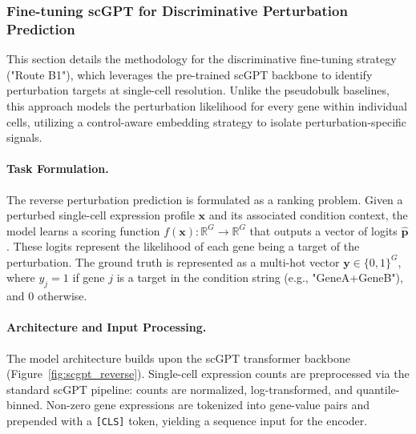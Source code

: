 \documentclass[conference]{IEEEtran}
\begin{document}
\subsubsection{Fine-tuning scGPT for Discriminative Perturbation Prediction}

This section details the methodology for the discriminative fine-tuning strategy ("Route B1"), which leverages the pre-trained scGPT backbone to identify perturbation targets at single-cell resolution. Unlike the pseudobulk baselines, this approach models the perturbation likelihood for every gene within individual cells, utilizing a control-aware embedding strategy to isolate perturbation-specific signals.

\paragraph{Task Formulation.}
The reverse perturbation prediction is formulated as a ranking problem. Given a perturbed single-cell expression profile $\mathbf{x}$ and its associated condition context, the model learns a scoring function $f(\mathbf{x}): \mathbb{R}^G \rightarrow \mathbb{R}^G$ that outputs a vector of logits $\hat{\mathbf{p}}$. These logits represent the likelihood of each gene being a target of the perturbation.
The ground truth is represented as a multi-hot vector $\mathbf{y} \in \{0,1\}^G$, where $y_j = 1$ if gene $j$ is a target in the condition string (e.g., "GeneA+GeneB"), and 0 otherwise.

\paragraph{Architecture and Input Processing.}
The model architecture builds upon the scGPT transformer backbone (Figure~\ref{fig:scgpt_reverse}). Single-cell expression counts are preprocessed via the standard scGPT pipeline: counts are normalized, log-transformed, and quantile-binned. Non-zero gene expressions are tokenized into gene-value pairs and prepended with a \texttt{[CLS]} token, yielding a sequence input for the encoder.
\end{document}
